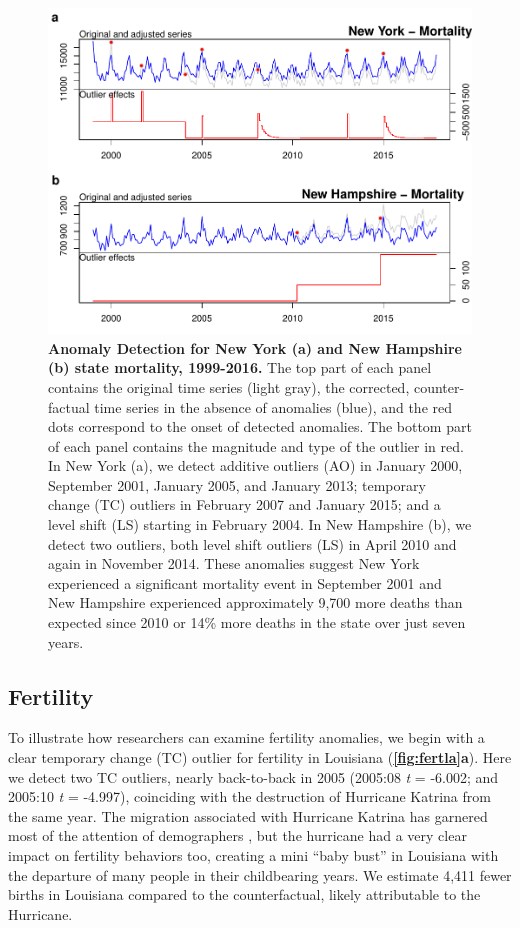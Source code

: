 \documentclass[12pt]{article}
\begin{document}
\begin{figure}
\centering
\includegraphics{manuscript_files/figure-latex/MortalityAnomalies-1.pdf}
\caption{\textbf{Anomaly Detection for New York (a) and New Hampshire (b) state mortality, 1999-2016.}
The top part of each panel contains the original time series (light
gray), the corrected, counter-factual time series in the absence of
anomalies (blue), and the red dots correspond to the onset of detected
anomalies. The bottom part of each panel contains the magnitude and type
of the outlier in red. In New York (a), we detect additive outliers (AO)
in January 2000, September 2001, January 2005, and January 2013;
temporary change (TC) outliers in February 2007 and January 2015; and a
level shift (LS) starting in February 2004. In New Hampshire (b), we
detect two outliers, both level shift outliers (LS) in April 2010 and
again in November 2014. These anomalies suggest New York experienced a
significant mortality event in September 2001 and New Hampshire
experienced approximately 9,700 more deaths than expected since 2010 or
14\% more deaths in the state over just seven years.
\label{fig:mortnewhamp}}
\end{figure}

\hypertarget{fertility}{%
\subsection{Fertility}\label{fertility}}

To illustrate how researchers can examine fertility anomalies, we begin
with a clear temporary change (TC) outlier for fertility in Louisiana
(\textbf{\autoref{fig:fertla}a}). Here we detect two TC outliers, nearly
back-to-back in 2005 (2005:08 \emph{t} = -6.002; and 2005:10 \emph{t} =
-4.997), coinciding with the destruction of Hurricane Katrina from the
same year. The migration associated with Hurricane Katrina has garnered
most of the attention of demographers
\citep{fussellRecoveryMigrationCity2014, horiDisplacementDynamicsSouthern2009},
but the hurricane had a very clear impact on fertility behaviors too,
creating a mini ``baby bust'' in Louisiana with the departure of many
people in their childbearing years. We estimate 4,411 fewer births in
Louisiana compared to the counterfactual, likely attributable to the
Hurricane.
\end{document}
